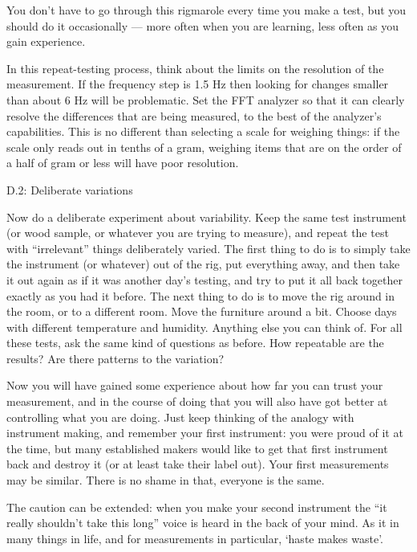   You don’t have to go through this rigmarole every time you make a test, but 
  you should do it occasionally — more often when you are learning, less often 
  as you gain experience. 

  In this repeat-testing process, think about the limits on the resolution of 
  the measurement. If the frequency step is 1.5 Hz then looking for changes 
  smaller than about 6 Hz will be problematic. Set the FFT analyzer so that it 
  can clearly resolve the differences that are being measured, to the best of 
  the analyzer’s capabilities. This is no different than selecting a scale for 
  weighing things: if the scale only reads out in tenths of a gram, weighing 
  items that are on the order of a half of gram or less will have poor 
  resolution. 

  D.2: Deliberate variations 

  Now do a deliberate experiment about variability. Keep the same test 
  instrument (or wood sample, or whatever you are trying to measure), and 
  repeat the test with “irrelevant” things deliberately varied. The first thing 
  to do is to simply take the instrument (or whatever) out of the rig, put 
  everything away, and then take it out again as if it was another day’s 
  testing, and try to put it all back together exactly as you had it before. 
  The next thing to do is to move the rig around in the room, or to a different 
  room. Move the furniture around a bit. Choose days with different temperature 
  and humidity. Anything else you can think of. For all these tests, ask the 
  same kind of questions as before. How repeatable are the results? Are there 
  patterns to the variation? 

  Now you will have gained some experience about how far you can trust your 
  measurement, and in the course of doing that you will also have got better at 
  controlling what you are doing. Just keep thinking of the analogy with 
  instrument making, and remember your first instrument: you were proud of it 
  at the time, but many established makers would like to get that first 
  instrument back and destroy it (or at least take their label out). Your first 
  measurements may be similar. There is no shame in that, everyone is the same. 

  The caution can be extended: when you make your second instrument the “it 
  really shouldn’t take this long” voice is heard in the back of your mind. As 
  it in many things in life, and for measurements in particular, ‘haste makes 
  waste’. 

